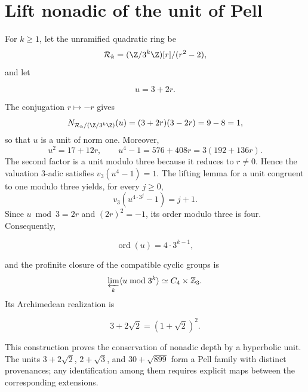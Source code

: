 \section{Lift nonadic of the unit of Pell}

For \(k\ge1\), let the unramified quadratic ring be
\begin{equation}
\mathcal R_k=(\Z/3^k\Z)[r]/(r^2-2),
\label{eq:pell-ring}
\end{equation}
and let

\[
u=3+2r.
\]

The conjugation \(r\mapsto-r\) gives
\[
N_{\mathcal R_k/(\Z/3^k\Z)}(u)
=(3+2r)(3-2r)=9-8=1,
\]
so that \(u\) is a unit of norm one. Moreover,
\[
u^2=17+12r,\qquad
u^4-1=576+408r=3(192+136r).
\]
The second factor is a unit modulo three because it reduces to \(r\ne0\). Hence
the valuation \(3\)-adic satisfies
\(v_3(u^4-1)=1\). The lifting lemma for a unit congruent to one
modulo three yields, for every \(j\ge0\),
\[
v_3\!\left(u^{4\cdot3^j}-1\right)=j+1.
\]
Since \(u\bmod3=2r\) and \((2r)^2=-1\), its order modulo three is four.
Consequently,

\begin{equation}
\operatorname{ord}(u)=4\cdot3^{k-1},
\label{eq:pell-order}
\end{equation}

and the profinite closure of the compatible cyclic groups is
\begin{equation}
\varprojlim_k\langle u\bmod3^k\rangle
\simeq C_4\times\mathbb Z_3.
\label{eq:pell-profinite}
\end{equation}
Its Archimedean realization is

\[
3+2\sqrt2=(1+\sqrt2)^2.
\]

This construction proves the conservation of nonadic depth
by a hyperbolic unit. The units \(3+2\sqrt2\),
\(2+\sqrt3\), and \(30+\sqrt{899}\) form a Pell family with
distinct provenances; any identification among them requires
explicit maps between the corresponding extensions.

